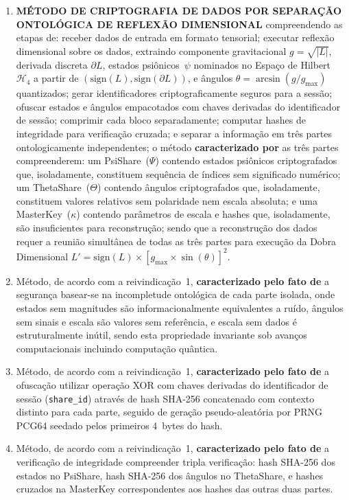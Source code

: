 \documentclass[12pt,a4paper]{article}
\newcommand{\Hfour}{\mathcal{H}_4}
\begin{document}
\begin{enumerate}

\item \textbf{MÉTODO DE CRIPTOGRAFIA DE DADOS POR SEPARAÇÃO
ONTOLÓGICA DE REFLEXÃO DIMENSIONAL} compreendendo as etapas de:
receber dados de entrada em formato tensorial; executar reflexão
dimensional sobre os dados, extraindo componente gravitacional
$g = \sqrt{|L|}$, derivada discreta $\partial L$, estados
psiônicos~$\psi$ nominados no Espaço de Hilbert~$\Hfour$ a
partir de $(\text{sign}(L), \text{sign}(\partial L))$, e
ângulos $\theta = \arcsin(g/g_{\max})$ quantizados; gerar
identificadores criptograficamente seguros para a sessão;
ofuscar estados e ângulos empacotados com chaves derivadas do
identificador de sessão; comprimir cada bloco separadamente;
computar hashes de integridade para verificação cruzada; e
separar a informação em três partes ontologicamente
independentes; o método \textbf{caracterizado por} as três
partes compreenderem: um PsiShare~($\Psi$) contendo estados
psiônicos criptografados que, isoladamente, constituem
sequência de índices sem significado numérico; um
ThetaShare~($\Theta$) contendo ângulos criptografados que,
isoladamente, constituem valores relativos sem polaridade nem
escala absoluta; e uma MasterKey~($\kappa$) contendo parâmetros
de escala e hashes que, isoladamente, são insuficientes para
reconstrução; sendo que a reconstrução dos dados requer a
reunião simultânea de todas as três partes para execução da
Dobra Dimensional
$L' = \text{sign}(L) \times [g_{\max} \times \sin(\theta)]^2$.

\item Método, de acordo com a reivindicação~1,
\textbf{caracterizado pelo fato de} a segurança basear-se na
incompletude ontológica de cada parte isolada, onde estados sem
magnitudes são informacionalmente equivalentes a ruído, ângulos
sem sinais e escala são valores sem referência, e escala sem
dados é estruturalmente inútil, sendo esta propriedade
invariante sob avanços computacionais incluindo computação
quântica.

\item Método, de acordo com a reivindicação~1,
\textbf{caracterizado pelo fato de} a ofuscação utilizar
operação XOR com chaves derivadas do identificador de sessão
(\texttt{share\_id}) através de hash SHA-256 concatenado com
contexto distinto para cada parte, seguido de geração
pseudo-aleatória por PRNG PCG64 seedado pelos primeiros 4~bytes
do hash.

\item Método, de acordo com a reivindicação~1,
\textbf{caracterizado pelo fato de} a verificação de
integridade compreender tripla verificação: hash SHA-256 dos
estados no PsiShare, hash SHA-256 dos ângulos no ThetaShare, e
hashes cruzados na MasterKey correspondentes aos hashes das
outras duas partes.


\end{enumerate}
\end{document}
